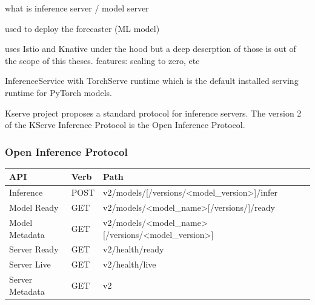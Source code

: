 what is
inference server / model server


used to deploy the forecaster (ML model)


uses Istio and Knative under the hood
but a deep descrption of those is out of the scope of this theses.
features: scaling to zero, etc


InferenceService with TorchServe runtime which is the default installed serving runtime for PyTorch models.

Kserve project proposes a standard protocol for inference servers.
The version 2 of the KServe Inference Protocol is the Open Inference Protocol.



\subsubsection{Open Inference Protocol}


\begin{table}[h!]
\centering
\begin{tabular}{|l|l|l|}
\hline
\textbf{API}    & \textbf{Verb} & \textbf{Path}                                                                                         \\ \hline
Inference       & POST          & v2/models/{[}/versions/\textless{}model\_version\textgreater{}{]}/infer                               \\ \hline
Model Ready     & GET           & v2/models/\textless{}model\_name\textgreater{}{[}/versions/{]}/ready                                  \\ \hline
Model Metadata  & GET           & v2/models/\textless{}model\_name\textgreater{}{[}/versions/\textless{}model\_version\textgreater{}{]} \\ \hline
Server Ready    & GET           & v2/health/ready                                                                                       \\ \hline
Server Live     & GET           & v2/health/live                                                                                        \\ \hline
Server Metadata & GET           & v2                                                                                                    \\ \hline
\end{tabular}
\end{table}





